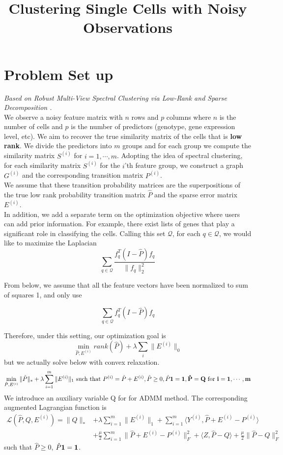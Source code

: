 \documentclass[11pt]{article}
\title{Clustering Single Cells with Noisy Observations}
\begin{document}
\maketitle
\section*{Problem Set up}
\textit{Based on \textit{Robust Multi-View Spectral Clustering via Low-Rank and Sparse Decomposition} \cite{xia2014robust}.} \\

\noindent We observe a noisy feature matrix with $n$ rows and $p$ columns where $n$ is the number of cells and $p$ is the number of predictors (genotype, gene expression level, etc). We aim to recover the true similarity matrix of the cells that is \textbf{low rank}. We divide the predictors into $m$ groups and for each group we compute the similarity matrix $S^{(i)}$ for $i = 1, \cdots , m$. Adopting the idea of spectral clustering, for each similarity matrix $S^{(i)}$ for the  $i$'th feature group, we construct a graph $G^{(i)}$ and the corresponding transition matrix $P^{(i)}$. \\

\noindent We assume that these transition probability matrices are the superpositions of the true low rank probability transition matrix $\hat{P}$ and the sparse error matrix $E^{(i)}$. \\

\noindent In addition, we add a separate term on the optimization objective where users can add prior information. For example, there exist lists of genes that play a significant role in classifying the cells. Calling this set $\mathcal{Q}$, for each $q \in \mathcal{Q}$, we would like to maximize the Laplacian
$$\sum_{q \in \mathcal{Q}} \frac{f_q^T (I-\hat{P})f_q}{\|f_q\|_2^2}$$

From below, we assume that all the feature vectors have been normalized to sum of squares 1, and only use 

$$\sum_{q \in \mathcal{Q}} f_q^T (I-\hat{P})f_q$$

\noindent Therefore, under this setting, our optimization goal is
$$\min_{\hat{P}, E^{(i)}} rank(\hat{P}) + \lambda \sum_i \|E^{(i)}\|_0$$
but we actually solve below with convex relaxation. 
$$\min_{\hat{P}, E^{(i)}} \|\hat{P}\|_* + \lambda \sum_{i=1}^{m} \|E^{(i)}\|_1 \text{ such that } P^{(i)} = \hat{P} + E^{(i)}, \hat{P}\geq 0, \hat{P} \bf{1} = \bf{1}, \hat{P} = Q \text{ for } i = 1, \cdots, m$$ 
We introduce an auxiliary variable Q for for ADMM method. The  corresponding augmented Lagrangian function is
\begin{align*}
\mathcal{L}(\hat{P},Q,E^{(i)}) = \|Q\|_* &+ \lambda \sum_{i=1}^{m} \|E^{(i)}\|_1 + \sum_{i=1}^{m} \langle Y^{(i)}, \hat{P} + E^{(i)}-P^{(i)} \rangle\\
&+ \frac{\mu}{2}\sum_{i=1}^{m} \| \hat{P} + E^{(i)} - P^{(i)}\|_F^2 + \langle Z, \hat{P}-Q \rangle + \frac{\mu}{2} \|\hat{P}-Q\|_F^2
\end{align*}
such that $\hat{P}\geq 0$, $\hat{P} \bf{1} = \bf{1}$.\\
\end{document}
